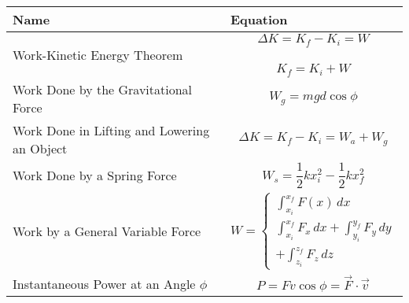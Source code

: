 \documentclass{article}
\begin{document}
\begin{tabularx}{\textwidth}{l | X }
Name & Equation \\
\hline\hline
Work-Kinetic Energy Theorem & \begin{equation*}
    \Delta K = K_f - K_i = W
\end{equation*} \
\begin{equation*}
    K_f = K_i + W
\end{equation*}\\
\hline
Work Done by the Gravitational Force & \begin{equation*}
    W_g = mgd\cos \phi
\end{equation*}\\
\hline
Work Done in Lifting and Lowering an Object & \begin{equation*}
    \Delta K = K_f - K_i = W_a + W_g
\end{equation*}\\
\hline
Work Done by a Spring Force & \begin{equation*}
    W_s = \frac{1}{2}kx_i^2 - \frac{1}{2}kx_f^2
\end{equation*} \\
\hline
Work by a General Variable Force & $$
W =\begin{cases}
			\int_{x_i}^{x_f} F (x) \,dx\\
            \int_{x_i}^{x_f} F_x \,dx + \int_{y_i}^{y_f} F_y \,dy \\ + \int_{z_i}^{z_f} F_z \,dz
		 \end{cases}
$$ \\
\hline
Instantaneous Power at an Angle $\phi$ & \begin{equation*}
    P = Fv \cos\phi = \vec{F}^{} \cdot \vec{v}^{}
\end{equation*} \\
\hline
\end{tabularx}
\end{document}
